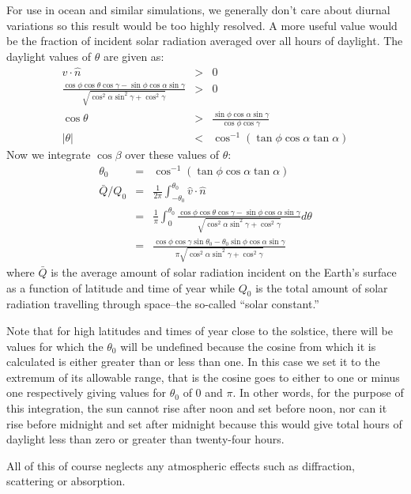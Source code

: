 \documentclass[11pt]{article}
\begin{document}
For use in ocean and similar simulations, we generally don't care about
diurnal variations so this result would be too highly resolved.
A more useful value would be the fraction of incident solar radiation
averaged over all hours of daylight.  The daylight values of $\theta$
are given as:
\begin{eqnarray}
\hat v \cdot \hat n & > & 0 \\
\frac{\cos \phi \cos \theta \cos \gamma - \sin \phi \cos \alpha \sin \gamma}
	{\sqrt{\cos^2 \alpha \sin^2 \gamma + \cos^2 \gamma}} & > & 0 \\
\cos \theta & > & \frac{\sin \phi \cos \alpha \sin \gamma}{\cos \phi \cos \gamma}\\
| \theta | & < & \cos^{-1} (\tan \phi \cos \alpha \tan \alpha) 
\end{eqnarray}
Now we integrate $\cos \beta$ over these values of $\theta$:
\begin{eqnarray}
\theta_0 & = & \cos^{-1} (\tan \phi \cos \alpha \tan \alpha) \\
\bar Q /Q_0 & = & \frac{1}{2\pi} \int_{-\theta_0}^{\theta_0} \hat v \cdot \hat n \\
	& = & \frac{1}{\pi} \int_0^{\theta_0} 
	\frac{\cos \phi \cos \theta \cos \gamma - \sin \phi \cos \alpha \sin \gamma}
	{\sqrt{\cos^2 \alpha \sin^2 \gamma + \cos^2 \gamma}} d\theta \\
	& = & \frac{\cos \phi \cos \gamma \sin \theta_0 - \theta_0 \sin \phi \cos \alpha \sin \gamma}
		{\pi \sqrt{\cos^2 \alpha \sin^2 \gamma + \cos^2 \gamma}} 
\end{eqnarray}
where $\bar Q$ is the average amount of solar radiation incident on the Earth's surface as a
function of latitude and time of year while $Q_0$ is the total amount of solar radiation
travelling through space--the so-called ``solar constant.''  

Note that for high latitudes
and times of year close to the solstice, there will be values
for which the $\theta_0$ will be undefined because the cosine from which it is calculated
is either greater than or less than one.  In this case we set it to the extremum of its
allowable range, that is the cosine goes to either to one or
minus one respectively giving values for $\theta_0$ of $0$ and $\pi$.
In other words, for the purpose of this integration,
the sun cannot rise after noon and set before noon, nor
can it rise before midnight and set after midnight because this would give
total hours of daylight less than zero or greater than twenty-four hours.

All of this of course neglects any atmospheric effects such as diffraction,
scattering or absorption.

 
\end{document}

